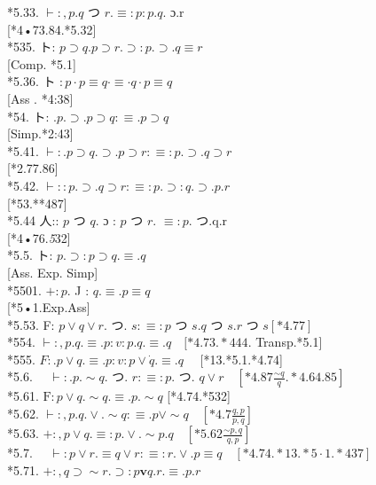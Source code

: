 \documentclass[10pt]{article}
\begin{document}
\begin{displayquote}
*5.33. $\vdash:, p . q$ つ $r . \equiv: p: p . q$. ɔ.r\\[0pt]
[*4•73.84.*5.32]\\
*535. ト: $p \supset q . p \supset r . \supset: p . \supset . q \equiv r$\\[0pt]
[Comp. *5.1]\\
*5.36. ト $: p \cdot p \equiv q \cdot \equiv \cdot q \cdot p \equiv q$\\[0pt]
[Ass . *4:38]\\
*54. ト: $. p . \supset . p \supset q: \equiv . p \supset q$\\[0pt]
[Simp.*2:43]\\
*5.41. $\vdash: . p \supset q . \supset . p \supset r: \equiv: p . \supset . q \supset r$\\[0pt]
[*2.77.86]\\
*5.42. $\vdash:: p . \supset . q \supset r: \equiv: p . \supset: q . \supset . p . r$\\[0pt]
[*53.**487]\\
*5.44 人:: $p$ つ $q$. ɔ : $p$ つ $r$. $\equiv: p$. つ.q.r\\[0pt]
[*4•76.\textit{5}32]\\
*5.5. ト: $p . \supset: p \supset q . \equiv . q$\\[0pt]
[Ass. Exp. Simp]\\
*5501. $+: p$. J : $q . \equiv . p \equiv q$\\[0pt]
[*5•1.Exp.Ass]\\
*5.53. F: $p \vee q \vee r$. つ. $s: \equiv: p$ つ $s . q$ つ $s . r$ つ $s[* 4.77]$\\
*554. $\vdash:, p . q . \equiv . p: v: p . q . \equiv . q \quad[* 4.73 . * 444$. Transp.*5.1]\\
*555. $F: . p \vee q . \equiv . p: v: p \vee \dot{q} . \equiv . q \quad$ [*13.*5.1.*4.74]\\
*5.6. $\quad \vdash: . p . \sim q$. つ. $r: \equiv: p$. つ. $q \vee r \quad\left[* 4.87 \frac{\sim q}{q} . * 4.64 .85\right]$\\
*5.61. $\mathrm{F}: p \vee q . \sim q . \equiv . p . \sim q$ [*4.74.*532]\\
*5.62. $\vdash:, p . q . \vee . \sim q: \equiv . p \vee \sim q \quad\left[* 4.7 \frac{q, p}{p, q}\right]$\\
*5.63. $+:, p \vee q . \equiv: p . \vee . \sim p . q \quad\left[* 5.62 \frac{\sim p, q}{q, p}\right]$\\
*5.7. $\quad \vdash: p \vee r . \equiv q \vee r: \equiv: r . \vee . p \equiv q \quad[* 4.74 . * 13 . * 5 \cdot 1 . * 437]$\\
*5.71. $+:, q \supset \sim r . \supset: p \mathbf{v} q . r . \equiv . p . r$
\end{displayquote}
\end{document}
